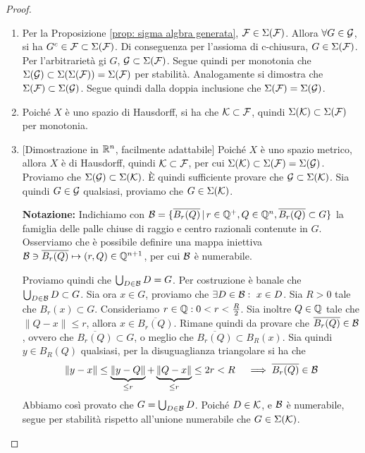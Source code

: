 \begin{proof}~
  \begin{enumerate}[label=$(\arabic*)$]
      \item Per la Proposizione \ref{prop: sigma algbra generata}, $\mathcal{F}\in \Sigma(\mathcal{F})$. Allora $\forall G\in \mathcal{G}$, si ha $G^c\in \mathcal{F}\subset \Sigma(\mathcal{F})$. Di conseguenza per l'assioma di c-chiusura, $G\in \Sigma(\mathcal{F})$. Per l'arbitrarietà gi $G$, $\mathcal{G}\subset \Sigma(\mathcal{F})$. Segue quindi per monotonia che $\Sigma(\mathcal{G})\subset \Sigma(\Sigma(\mathcal{F}))=\Sigma(\mathcal{F})$ per stabilità. Analogamente si dimostra che $\Sigma(\mathcal{F})\subset \Sigma(\mathcal{G})$. Segue quindi dalla doppia inclusione che  $\Sigma(\mathcal{F}) = \Sigma(\mathcal{G})$.
      \item Poiché $X$ è uno spazio di Hausdorff, si ha che $\mathcal{K}\subset \mathcal{F}$, quindi $\Sigma(\mathcal{K})\subset \Sigma(\mathcal{F})$ per monotonia.
      \item {[Dimostrazione in $\mathbb{R}^n$, facilmente adattabile]} Poiché $X$ è uno spazio metrico, allora $X$ è di Hausdorff, quindi $\mathcal{K}\subset \mathcal{F}$, per cui $\Sigma(\mathcal{K})\subset \Sigma(\mathcal{F})=\Sigma(\mathcal{G})$. Proviamo che $\Sigma(\mathcal{G})\subset \Sigma(\mathcal{K})$. È quindi sufficiente provare che $\mathcal{G}\subset \Sigma (\mathcal{K})$. Sia quindi $G\in \mathcal{G}$ qualsiasi, proviamo che $G\in \Sigma(\mathcal{K})$.
      
      \textbf{Notazione:} Indichiamo con $\mathcal{B}=\{\overline{B_r(Q)}\,|\,r\in \mathbb{Q}^+, Q\in \mathbb{Q}^n, \overline{B_r(Q)}\subset G\}$ la famiglia delle palle chiuse di raggio e centro razionali contenute in $G$. Osserviamo che è possibile definire una mappa iniettiva  $\mathcal{B}\ni \overline{B_r(Q)}\mapsto (r,Q)\in\mathbb{Q}^{n+1}$, per cui $\mathcal{B}$ è numerabile. 

      Proviamo quindi che $\bigcup_{D\in \mathcal{B}}D=G$. Per costruzione è banale che $\bigcup_{D\in \mathcal{B}}D\subset G$. Sia ora $x\in G$, proviamo che $\exists D\in \mathcal{B}:\ x\in D$. Sia $R>0$ tale che $B_r(x)\subset G$. Consideriamo $r\in \mathbb{Q} : 0<r<\frac{R}{2}$. Sia inoltre $Q\in \mathbb{Q}$ tale che $\|Q-x\|\leq r$, allora $x\in \overline{B_r(Q)}$. Rimane quindi da provare che $\overline{B_r(Q)}\in\mathcal{B}$, ovvero che $\overline{B_r(Q)}\subset G$, o meglio che $\overline{B_r(Q)}\subset B_R(x)$. Sia quindi $y\in B_R(Q)$ qualsiasi, per la disuguaglianza triangolare si ha che 
      \[\|y-x\|\leq \underbrace{\|y-Q\|}_{\leq r}+\underbrace{\|Q-x\|}_{\leq r}\leq 2r <R\quad \implies \overline{B_r(Q)}\in \mathcal{B}\]
      Abbiamo così provato che $G=\bigcup_{D\in \mathcal{B}}D$. Poiché $D\in \mathcal{K}$, e $\mathcal{B}$ è numerabile, segue per stabilità rispetto all'unione numerabile che $G\in \Sigma(\mathcal{K})$.
  \end{enumerate}
\end{proof}


